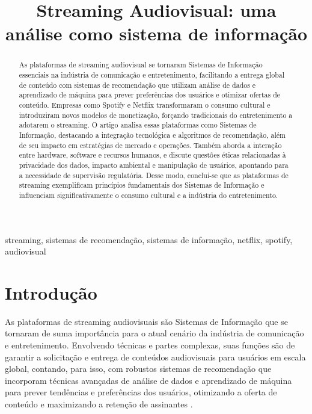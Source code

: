 \documentclass[conference]{IEEEtran}
\begin{document}
\title{Streaming Audiovisual: uma análise como sistema de informação}

\author{
\and
{}
}

\maketitle

\begin{abstract}

As plataformas de streaming audiovisual se tornaram Sistemas de Informação essenciais na indústria de comunicação e entretenimento, facilitando a entrega global de conteúdo com sistemas de recomendação que utilizam análise de dados e aprendizado de máquina para prever preferências dos usuários e otimizar ofertas de conteúdo. Empresas como Spotify e Netflix transformaram o consumo cultural e introduziram novos modelos de monetização, forçando tradicionais do entretenimento a adotarem o streaming. O artigo analisa essas plataformas como Sistemas de Informação, destacando a integração tecnológica e algoritmos de recomendação, além de seu impacto em estratégias de mercado e operações. Também aborda a interação entre hardware, software e recursos humanos, e discute questões éticas relacionadas à privacidade dos dados, impacto ambiental e manipulação de usuários, apontando para a necessidade de supervisão regulatória. Desse modo, conclui-se que as plataformas de streaming exemplificam princípios fundamentais dos Sistemas de Informação e influenciam significativamente o consumo cultural e a indústria do entretenimento.\end{abstract}


\begin{IEEEkeywords}
streaming, sistemas de recomendação, sistemas de informação, netflix, spotify, audiovisual
\end{IEEEkeywords}

\section{Introdução}
As plataformas de streaming audiovisuais são Sistemas de Informação que se tornaram de suma importância para o atual cenário da indústria de comunicação e entretenimento. Envolvendo técnicas e partes complexas, suas funções são de garantir a solicitação e entrega de conteúdos audiovisuais para usuários em escala global, contando, para isso, com robustos sistemas de recomendação que incorporam técnicas avançadas de análise de dados e aprendizado de máquina para prever tendências e preferências dos usuários, otimizando a oferta de conteúdo e maximizando a retenção de assinantes \cite{b1}.
\end{document}
